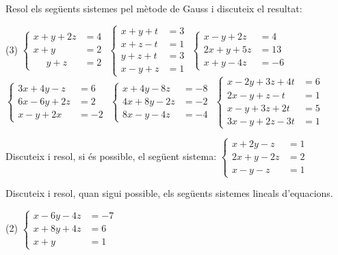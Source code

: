 \begin{mylist}
\exer  Resol els següents sistemes pel mètode de Gauss i discuteix el resultat:
 \begin{tasks}(3)
\task $\left\{\begin{array}{ll} x+y+2z&=4 \\ x+y&=2 \\ \quad \,\, y+z&=2 \end{array}\right. $   
\task $\left\{\begin{array}{rl} x+y+t&=3 \\ x+z-t&=1 \\ y+z+t&=3 \\ x-y+z&=1 \end{array}\right. $   
 \task $\left\{\begin{array}{rl} x-y+2z&=4 \\ 2x+y+5z&=13 \\ x+y-4z&=-6 \end{array}\right. $ 
\task $\left\{\begin{array}{rl} 3x+4y-z&=6 \\ 6x-6y+2z&=2 \\ x-y+2x&=-2 \end{array}\right. $   
\task $\left\{\begin{array}{rl} x+4y-8z&=-8 \\ 4x+8y-2z&=-2 \\ 8x-y-4z&=-4 \end{array}\right. $   
\task $\left\{\begin{array}{rl} x-2y+3z+4t&=6 \\ 2x-y+z-t&=1 \\ x-y+3z+2t&=5 \\ 3x-y+2z-3t&=1 \end{array}\right. $
  \end{tasks}
\answers[cols=1]{[
	$x=1; y=1; z=1$, 
	$x=1; y=1; z=1; t=1$, 
	$x=1; y=1; z=2$, 
	$x=\dfrac{5}{9}; y=\dfrac{11}{3}; z=\dfrac{31}{3}$
	$x=0; y=0; z=1$, 
	$x=1; y=1; z=1; t=1$
	]}

	\exer  Discuteix i resol, si és possible, el següent sistema:
	$\left\{\begin{array}{ll} x+2y-z&=1 \\ 2x+y-2z&=2 \\ x-y-z&=1 \end{array}\right.$ 
	
	\exer  Discuteix i resol, quan sigui possible, els següents sistemes  lineals d'equacions.
   \begin{tasks}(2)
	\task $\left\{\begin{array}{ll} x-6y-4z&=-7 \\ x+8y+4z&=6 \\  x+y&=1 \end{array}\right.$
	

\end{tasks}
\end{mylist}
